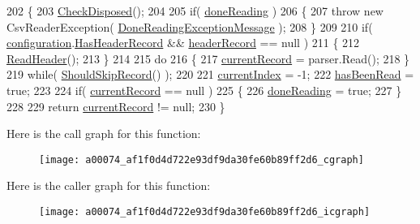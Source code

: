 \begin{DoxyCode}
202         \{
203             \hyperlink{a00074_a6fa45a46ed1322dc1872ca2321b5edbc}{CheckDisposed}();
204 
205             \textcolor{keywordflow}{if}( \hyperlink{a00074_a04a4a668ae50f5383cdd2a1691bbd718}{doneReading} )
206             \{
207                 \textcolor{keywordflow}{throw} \textcolor{keyword}{new} CsvReaderException( \hyperlink{a00074_abea2bd0359f517019984de31f9d9fb96}{DoneReadingExceptionMessage} );
208             \}
209 
210             \textcolor{keywordflow}{if}( \hyperlink{a00074_a695622911e45cbac8d67dcbd9a3e2967}{configuration}.\hyperlink{a00060_a9e439f90bfac500d24d6e2e731240439}{HasHeaderRecord} && 
      \hyperlink{a00074_aa6e5fd8aa2961442ca1caf7a4ac54d65}{headerRecord} == null )
211             \{
212                 \hyperlink{a00074_a57ba5fa523de97bd2cf068973329090d}{ReadHeader}();
213             \}
214 
215             \textcolor{keywordflow}{do}
216             \{
217                 \hyperlink{a00074_ab2bfef15784add66e441c9d3a0d73751}{currentRecord} = parser.Read();
218             \} 
219             \textcolor{keywordflow}{while}( \hyperlink{a00074_a3b8db0163b61e20d56ed8626e21338d6}{ShouldSkipRecord}() );
220 
221             \hyperlink{a00074_a56e974bc7e2242912e956393e831e166}{currentIndex} = -1;
222             \hyperlink{a00074_a34d0725235d140229f6a07e4c3b83552}{hasBeenRead} = \textcolor{keyword}{true};
223 
224             \textcolor{keywordflow}{if}( \hyperlink{a00074_ab2bfef15784add66e441c9d3a0d73751}{currentRecord} == null )
225             \{
226                 \hyperlink{a00074_a04a4a668ae50f5383cdd2a1691bbd718}{doneReading} = \textcolor{keyword}{true};
227             \}
228 
229             \textcolor{keywordflow}{return} \hyperlink{a00074_ab2bfef15784add66e441c9d3a0d73751}{currentRecord} != null;
230         \}
\end{DoxyCode}


Here is the call graph for this function\-:
\nopagebreak
\begin{figure}[H]
\begin{center}
\leavevmode
\texttt{[image: a00074\_af1f0d4d722e93df9da30fe60b89ff2d6\_cgraph]}
\end{center}
\end{figure}




Here is the caller graph for this function\-:
\nopagebreak
\begin{figure}[H]
\begin{center}
\leavevmode
\texttt{[image: a00074\_af1f0d4d722e93df9da30fe60b89ff2d6\_icgraph]}
\end{center}
\end{figure}


